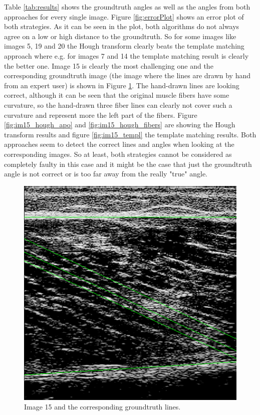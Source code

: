 \documentclass[10pt,twocolumn,letterpaper]{article}
\begin{document}
Table \ref{tab:results} shows the groundtruth angles as well as the angles from both approaches for every single image.
Figure \ref{fig:errorPlot} shows an error plot of both strategies. As it can be seen in the plot, both algorithms do not always agree on a low or high distance to the groundtruth. So for some images like images 5, 19 and 20 the Hough transform clearly beats the template matching approach where e.g. for images 7 and 14 the template matching result is clearly the better one.
Image 15 is clearly the most challenging one and the corresponding groundtruth image (the image where the lines are drawn by hand from an expert user) is shown in Figure \ref{fig:im15_gt}. 
The hand-drawn lines are looking correct, although it can be seen that the original muscle fibers have some curvature, so the hand-drawn three fiber lines can clearly not cover such a curvature and represent more the left part of the fibers.
Figure \ref{fig:im15_hough_apo} and \ref{fig:im15_hough_fibers} are showing the Hough transform results and figure \ref{fig:im15_templ} the template matching results.
Both approaches seem to detect the correct lines and angles when looking at the corresponding images. So at least, both strategies cannot be considered as completely faulty in this case and it might be the case that just the groundtruth angle is not correct or is too far away from the really "true" angle.

\begin{figure}
	\begin{center}		
		\includegraphics[width=1\linewidth]{img/im15_gt}
	\end{center}
	\caption{Image 15 and the corresponding groundtruth lines.}
	\label{fig:im15_gt}
	
\end{figure}
\end{document}
